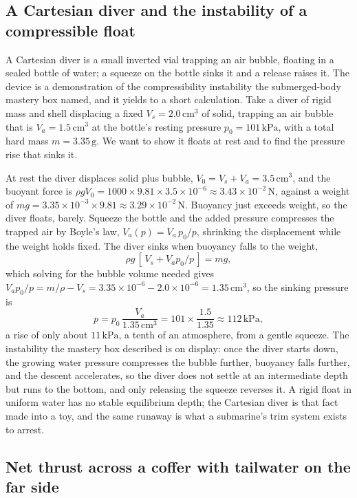 \subsection{A Cartesian diver and the instability of a compressible float}

A Cartesian diver is a small inverted vial trapping an air bubble, floating
in a sealed bottle of water; a squeeze on the bottle sinks it and a release
raises it. The device is a demonstration of the compressibility instability
the submerged-body mastery box named, and it yields to a short calculation.
Take a diver of rigid mass and shell displacing a fixed $V_s = 2.0\,\text{
cm}^3$ of solid, trapping an air bubble that is $V_a = 1.5\,\text{cm}^3$ at
the bottle's resting pressure $p_0 = 101\,\text{kPa}$, with a total hard
mass $m = 3.35\,\si{\gram}$. We want to show it floats at rest and to find
the pressure rise that sinks it.

At rest the diver displaces solid plus bubble, $V_0 = V_s + V_a = 3.5\,
\text{cm}^3$, and the buoyant force is $\rho g V_0 = 1000 \times 9.81
\times 3.5 \times 10^{-6} \approx 3.43 \times 10^{-2}\,\text{N}$, against a
weight of $m g = 3.35 \times 10^{-3} \times 9.81 \approx 3.29 \times
10^{-2}\,\text{N}$. Buoyancy just exceeds weight, so the diver floats,
barely. Squeeze the bottle and the added pressure compresses the trapped
air by Boyle's law, $V_a(p) = V_a\,p_0/p$, shrinking the displacement while
the weight holds fixed. The diver sinks when buoyancy falls to the weight,
\[
\rho g\,[\,V_s + V_a p_0/p\,] = m g,
\]
which solving for the bubble volume needed gives $V_a p_0/p = m/\rho - V_s
= 3.35 \times 10^{-6} - 2.0 \times 10^{-6} = 1.35\,\text{cm}^3$, so the
sinking pressure is
\[
p = p_0\,\frac{V_a}{1.35\,\text{cm}^3}
= 101 \times \frac{1.5}{1.35}
\approx 112\,\text{kPa},
\]
a rise of only about $11\,\text{kPa}$, a tenth of an atmosphere, from a
gentle squeeze. The instability the mastery box described is on display: once
the diver starts down, the growing water pressure compresses the bubble
further, buoyancy falls further, and the descent accelerates, so the diver
does not settle at an intermediate depth but runs to the bottom, and only
releasing the squeeze reverses it. A rigid float in uniform water has no
stable equilibrium depth; the Cartesian diver is that fact made into a toy,
and the same runaway is what a submarine's trim system exists to arrest.

\subsection{Net thrust across a coffer with tailwater on the far side}

